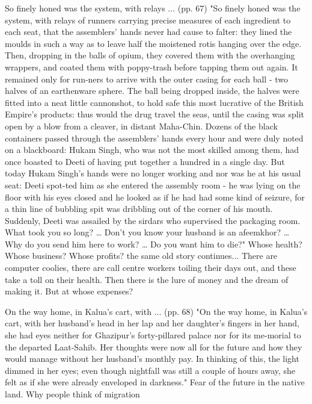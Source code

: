 So finely honed was the system, with relays ... (pp. 67)
"So finely honed was the system, with relays of runners carrying precise measures of each ingredient to each seat, that the assemblers’ hands never had cause to falter: they lined the moulds in such a way as to leave half the moistened rotis hanging over the edge. Then, dropping in the balls of opium, they covered them with the overhanging wrappers, and coated them with poppy-trash before tapping them out again. It remained only for run-ners to arrive with the outer casing for each ball - two halves of an earthenware sphere. The ball being dropped inside, the halves were fitted into a neat little cannonshot, to hold safe this most lucrative of the British Empire’s products: thus would the drug travel the seas, until the casing was split open by a blow from a cleaver, in distant Maha-Chin. Dozens of the black containers passed through the assemblers’ hands every hour and were duly noted on a blackboard: Hukam Singh, who was not the most skilled among them, had once boasted to Deeti of having put together a hundred in a single day. But today Hukam Singh’s hands were no longer working and nor was he at his usual seat: Deeti spot-ted him as she entered the assembly room - he was lying on the floor with his eyes closed and he looked as if he had had some kind of seizure, for a thin line of bubbling spit was dribbling out of the corner of his mouth. Suddenly, Deeti was assailed by the sirdars who supervised the packaging room. What took you so long? … Don’t you know your husband is an afeemkhor? … Why do you send him here to work? … Do you want him to die?"
Whose health? Whose business? Whose profits? the same old story continues... There are computer coolies, there are call centre workers toiling their days out, and these take a toll on their health. Then there is the lure of money and the dream of making it. But at whose expenses?

On the way home, in Kalua’s cart, with ... (pp. 68)
"On the way home, in Kalua’s cart, with her husband’s head in her lap and her daughter’s fingers in her hand, she had eyes neither for Ghazipur’s forty-pillared palace nor for its me-morial to the departed Laat-Sahib. Her thoughts were now all for the future and how they would manage without her husband’s monthly pay. In thinking of this, the light dimmed in her eyes; even though nightfall was still a couple of hours away, she felt as if she were already enveloped in darkness."
Fear of the future in the native land. Why people think of migration

